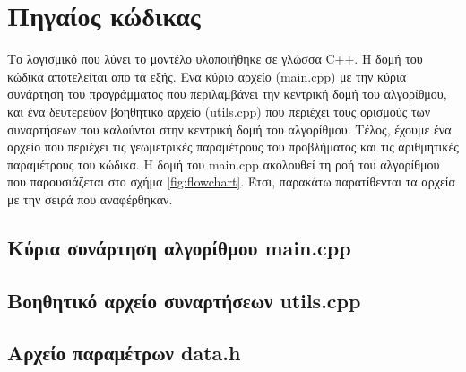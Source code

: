 \section{Πηγαίος κώδικας}

Το λογισμικό που λύνει το μοντέλο υλοποιήθηκε σε γλώσσα C++. Η δομή του κώδικα αποτελείται απο τα εξής. Ενα κύριο αρχείο (main.cpp) με την κύρια συνάρτηση του προγράμματος που περιλαμβάνει την κεντρική δομή του αλγορίθμου, και ένα δευτερεύον βοηθητικό αρχείο (utils.cpp) που περιέχει τους ορισμούς των συναρτήσεων που καλούνται στην κεντρική δομή του αλγορίθμου. Τέλος, έχουμε ένα αρχείο που περιέχει τις γεωμετρικές παραμέτρους του προβλήματος και τις αριθμητικές παραμέτρους του κώδικα. Η δομή του main.cpp ακολουθεί τη ροή του αλγορίθμου που παρουσιάζεται στο σχήμα \ref{fig:flowchart}.
Έτσι, παρακάτω παρατίθενται τα αρχεία με την σειρά που αναφέρθηκαν.

\subsection{Κύρια συνάρτηση αλγορίθμου main.cpp}



\vspace{4.5cm}
\subsection{Βοηθητικό αρχείο συναρτήσεων utils.cpp}



\vspace{3cm}
\subsection{Αρχείο παραμέτρων data.h}

